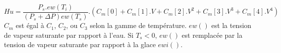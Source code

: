 \[
Hu = \frac{ P_s . ew(T_i)}{(P_s + \Delta P) ew(T_s)}
     .\left( C_m[0] + C_m[1].V + C_m[2].V^2 + C_m[3].V^3 + C_m[4].V^4 \right)
\]
$C_m$ est \'egal \`a $C_1$, $C_2$, ou $C_3$ selon la gamme de 
temp\'erature.\newline
$ew()$ est la tension de vapeur saturante par rapport \`a l'eau.
Si $T_s < 0$, $ew()$ est remplac\'ee par la tension de vapeur saturante
par rapport \`a la glace $ewi()$. 

